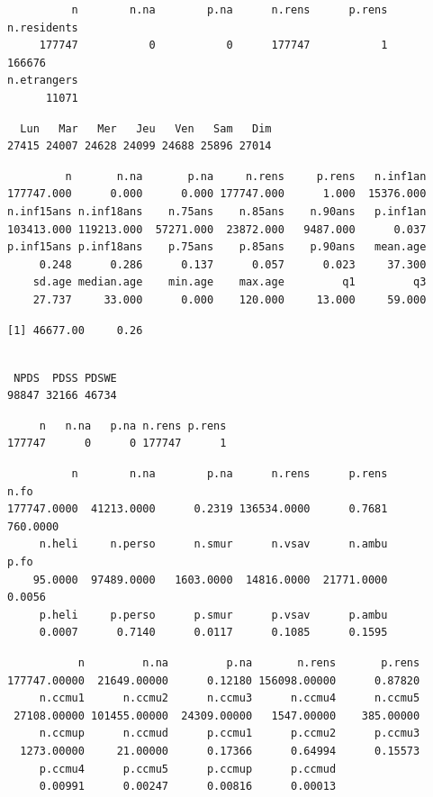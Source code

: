 \documentclass[]{article}
\begin{document}
\begin{verbatim}
          n        n.na        p.na      n.rens      p.rens n.residents 
     177747           0           0      177747           1      166676 
n.etrangers 
      11071 
\end{verbatim}

\begin{verbatim}
  Lun   Mar   Mer   Jeu   Ven   Sam   Dim 
27415 24007 24628 24099 24688 25896 27014 
\end{verbatim}

\begin{verbatim}
         n       n.na       p.na     n.rens     p.rens   n.inf1an 
177747.000      0.000      0.000 177747.000      1.000  15376.000 
n.inf15ans n.inf18ans    n.75ans    n.85ans    n.90ans   p.inf1an 
103413.000 119213.000  57271.000  23872.000   9487.000      0.037 
p.inf15ans p.inf18ans    p.75ans    p.85ans    p.90ans   mean.age 
     0.248      0.286      0.137      0.057      0.023     37.300 
    sd.age median.age    min.age    max.age         q1         q3 
    27.737     33.000      0.000    120.000     13.000     59.000 
\end{verbatim}

\begin{verbatim}
[1] 46677.00     0.26
\end{verbatim}

\begin{verbatim}

 NPDS  PDSS PDSWE 
98847 32166 46734 
\end{verbatim}

\begin{verbatim}
     n   n.na   p.na n.rens p.rens 
177747      0      0 177747      1 
\end{verbatim}

\begin{verbatim}
          n        n.na        p.na      n.rens      p.rens        n.fo 
177747.0000  41213.0000      0.2319 136534.0000      0.7681    760.0000 
     n.heli     n.perso      n.smur      n.vsav      n.ambu        p.fo 
    95.0000  97489.0000   1603.0000  14816.0000  21771.0000      0.0056 
     p.heli     p.perso      p.smur      p.vsav      p.ambu 
     0.0007      0.7140      0.0117      0.1085      0.1595 
\end{verbatim}

\begin{verbatim}
           n         n.na         p.na       n.rens       p.rens 
177747.00000  21649.00000      0.12180 156098.00000      0.87820 
     n.ccmu1      n.ccmu2      n.ccmu3      n.ccmu4      n.ccmu5 
 27108.00000 101455.00000  24309.00000   1547.00000    385.00000 
     n.ccmup      n.ccmud      p.ccmu1      p.ccmu2      p.ccmu3 
  1273.00000     21.00000      0.17366      0.64994      0.15573 
     p.ccmu4      p.ccmu5      p.ccmup      p.ccmud 
     0.00991      0.00247      0.00816      0.00013 
\end{verbatim}
\end{document}
